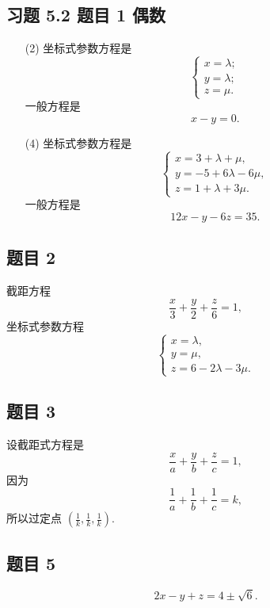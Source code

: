\subsection*{ 习题 5.2 题目 1 偶数 }
\begin{solution}
\begin{enumerate}
    \item[(2)]
    坐标式参数方程是 
    \[
        \begin{cases}
            x = \lambda; \\
            y = \lambda; \\
            z = \mu.
        \end{cases}
    \]
    一般方程是
    \[
        x - y = 0.
    \]
    \item[(4)] 
    坐标式参数方程是 
    \[
        \begin{cases}
            x = 3 + \lambda + \mu, \\
            y = -5 + 6\lambda - 6\mu, \\
            z = 1 + \lambda + 3\mu.
        \end{cases}
    \]
    一般方程是
    \[
        12x - y - 6z = 35.
    \]
\end{enumerate}
\end{solution}

\subsection*{ 题目 2 }
\begin{solution}
截距方程
\[
\frac{x}{3} + \frac{y}{2} + \frac{z}{6} = 1,
\]
坐标式参数方程
\[
\begin{cases}
    x = \lambda, \\
    y = \mu, \\
    z = 6 - 2\lambda - 3\mu.
\end{cases}
\]
\end{solution}

\subsection*{ 题目 3 }
\begin{solution}
设截距式方程是
\[
\frac{x}{a} + \frac{y}{b} + \frac{z}{c} = 1,
\]
因为
\[
    \frac{1}{a} + \frac{1}{b} + \frac{1}{c} = k,
\]
所以过定点 $(\frac{1}{k}, \frac{1}{k}, \frac{1}{k})$.
\end{solution}

\subsection*{ 题目 5 }
\begin{solution}
\[
2x - y + z = 4 \pm \sqrt{6}.
\]
\end{solution}


